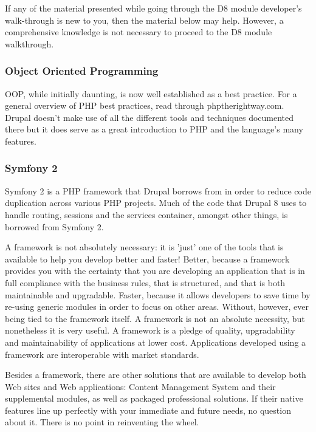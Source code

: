 If any of the material presented while going through the D8 module developer's walk-through is new to you, then the material below may help. However, a comprehensive knowledge is not necessary to proceed to the D8 module walkthrough.

\subsubsection{Object Oriented Programming}

OOP, while initially daunting, is now well established as a best practice.
For a general overview of PHP best practices, read through phptherightway.com. Drupal doesn't make use of all the different tools and techniques documented there but it does serve as a great introduction to PHP and the language's many features.

\subsubsection{Symfony 2}

Symfony 2 is a PHP framework that Drupal borrows from in order to reduce code duplication across various PHP projects. Much of the code that Drupal 8 uses to handle routing, sessions and the services container, amongst other things, is borrowed from Symfony 2.

A framework is not absolutely necessary: it is 'just' one of the tools that is available to help you develop better and faster!
Better, because a framework provides you with the certainty that you are developing an application that is in full compliance with the business rules, that is structured, and that is both maintainable and upgradable.
Faster, because it allows developers to save time by re-using generic modules in order to focus on other areas. Without, however, ever being tied to the framework itself.
A framework is not an absolute necessity, but nonetheless it is very useful. A framework is a pledge of quality, upgradability and maintainability of applications at lower cost. Applications developed using a framework are interoperable with market standards.

Besides a framework, there are other solutions that are available to develop both Web sites and Web applications: Content Management System and their supplemental modules, as well as packaged professional solutions. If their native features line up perfectly with your immediate and future needs, no question about it. There is no point in reinventing the wheel.



